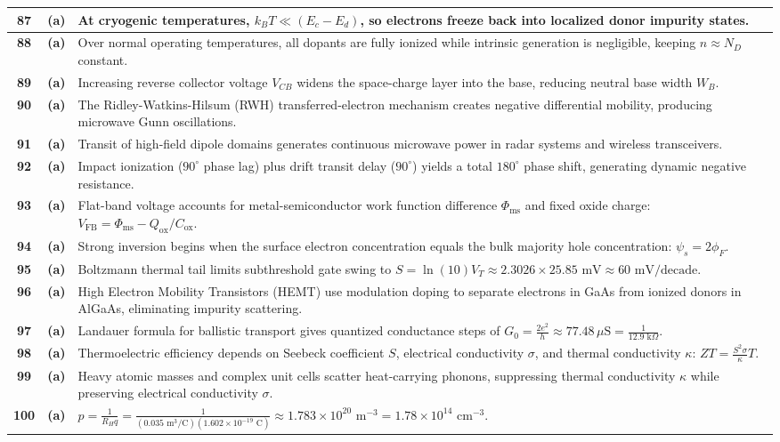 {\begin{tabularx}{\textwidth}{|c|c|X|}
\textbf{87} & \textbf{(a)} & At cryogenic temperatures, $k_BT \ll (E_c - E_d)$, so electrons freeze back into localized donor impurity states. \\ \hline
\textbf{88} & \textbf{(a)} & Over normal operating temperatures, all dopants are fully ionized while intrinsic generation is negligible, keeping $n \approx N_D$ constant. \\ \hline
\textbf{89} & \textbf{(a)} & Increasing reverse collector voltage $V_{CB}$ widens the space-charge layer into the base, reducing neutral base width $W_B$. \\ \hline
\textbf{90} & \textbf{(a)} & The Ridley-Watkins-Hilsum (RWH) transferred-electron mechanism creates negative differential mobility, producing microwave Gunn oscillations. \\ \hline
\textbf{91} & \textbf{(a)} & Transit of high-field dipole domains generates continuous microwave power in radar systems and wireless transceivers. \\ \hline
\textbf{92} & \textbf{(a)} & Impact ionization ($90^\circ$ phase lag) plus drift transit delay ($90^\circ$) yields a total $180^\circ$ phase shift, generating dynamic negative resistance. \\ \hline
\textbf{93} & \textbf{(a)} & Flat-band voltage accounts for metal-semiconductor work function difference $\Phi_{\text{ms}}$ and fixed oxide charge: $V_{\text{FB}} = \Phi_{\text{ms}} - Q_{\text{ox}}/C_{\text{ox}}$. \\ \hline
\textbf{94} & \textbf{(a)} & Strong inversion begins when the surface electron concentration equals the bulk majority hole concentration: $\psi_s = 2\phi_F$. \\ \hline
\textbf{95} & \textbf{(a)} & Boltzmann thermal tail limits subthreshold gate swing to $S = \ln(10)V_T \approx 2.3026 \times 25.85\text{ mV} \approx 60\text{ mV/decade}$. \\ \hline
\textbf{96} & \textbf{(a)} & High Electron Mobility Transistors (HEMT) use modulation doping to separate electrons in GaAs from ionized donors in AlGaAs, eliminating impurity scattering. \\ \hline
\textbf{97} & \textbf{(a)} & Landauer formula for ballistic transport gives quantized conductance steps of $G_0 = \frac{2e^2}{h} \approx 77.48\,\mu\text{S} = \frac{1}{12.9\text{ k}\Omega}$. \\ \hline
\textbf{98} & \textbf{(a)} & Thermoelectric efficiency depends on Seebeck coefficient $S$, electrical conductivity $\sigma$, and thermal conductivity $\kappa$: $ZT = \frac{S^2 \sigma}{\kappa}T$. \\ \hline
\textbf{99} & \textbf{(a)} & Heavy atomic masses and complex unit cells scatter heat-carrying phonons, suppressing thermal conductivity $\kappa$ while preserving electrical conductivity $\sigma$. \\ \hline
\textbf{100} & \textbf{(a)} & $p = \frac{1}{R_H q} = \frac{1}{(0.035\text{ m}^3/\text{C})(1.602 \times 10^{-19}\text{ C})} \approx 1.783 \times 10^{20}\text{ m}^{-3} = 1.78 \times 10^{14}\text{ cm}^{-3}$. \\ \hline
\end{tabularx}
}


